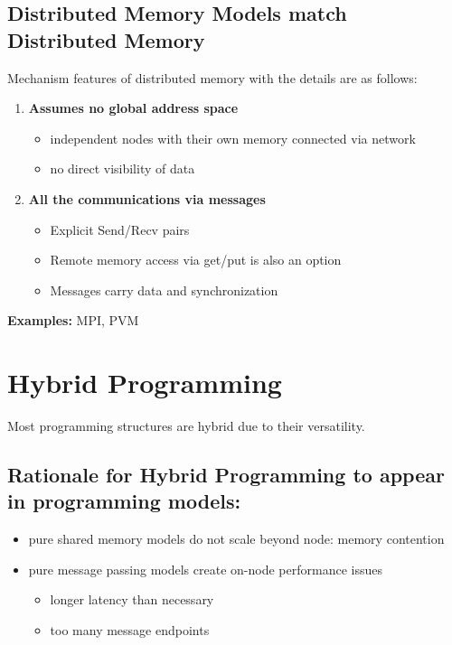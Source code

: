 \documentclass[12pt, a4paper]{report}
\begin{document}
\subsection{Distributed Memory Models match Distributed Memory}
Mechanism features of distributed memory with the details are as follows:
\begin{enumerate}[label={\bfseries (\Alph*)}]
    \item {\bfseries Assumes no global address space}
        \begin{itemize}
            \item independent nodes with their own memory connected via network
            \item no direct visibility of data
        \end{itemize}
    
    \item {\bfseries All the communications via messages}
        \begin{itemize}
            \item Explicit Send/Recv pairs
            \item Remote memory access via get/put is also an option
            \item Messages carry data and synchronization
        \end{itemize}
\end{enumerate}

{\bfseries Examples:} MPI, PVM

\section{Hybrid Programming}
Most programming structures are hybrid due to their versatility.

\subsection{Rationale for Hybrid Programming to appear in programming models:}
\begin{itemize}
    \item pure shared memory models do not scale beyond node: memory contention
    \item pure message passing models create on-node performance issues
            \begin{itemize}
                \item longer latency than necessary
                \item too many message endpoints
            \end{itemize}
\end{itemize}
\end{document}
